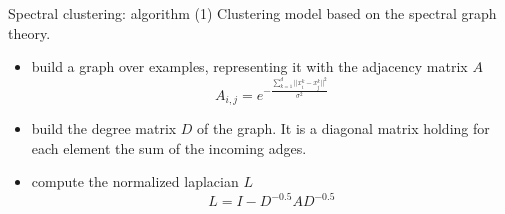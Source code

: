 \begin{frame}{Spectral clustering: algorithm (1)}
Clustering model based on the spectral graph theory.
\begin{itemize}
\item build a graph over examples, representing it with the adjacency matrix $A$
\begin{equation*}
A_{i,j} = e^{-\frac{\sum_{k=1}^d||x_i^k-x_j^k||^2}{\sigma^2}}
\end{equation*}
\item build the degree matrix $D$ of the graph. It is a diagonal matrix holding for each element the sum of the incoming adges.
\item compute the normalized laplacian $L$
\begin{equation}
L=I-D^{-0.5}AD^{-0.5}
\end{equation}
\end{itemize}
\end{frame}